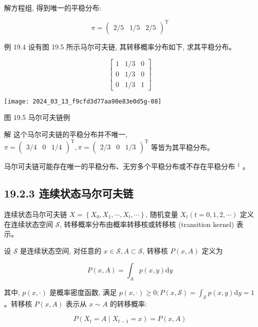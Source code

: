 \documentclass[10pt]{article}
\begin{document}
\begin{CJK*}{UTF8}{bsmi}
解方程组, 得到唯一的平稳分布:

$$
\pi=\left(\begin{array}{lll}
2 / 5 & 1 / 5 & 2 / 5
\end{array}\right)^{\mathrm{T}}
$$

例 19.4 设有图 19.5 所示马尔可夫链, 其转移概率分布如下, 求其平稳分布。

$$
\left[\begin{array}{lll}
1 & 1 / 3 & 0 \\
0 & 1 / 3 & 0 \\
0 & 1 / 3 & 1
\end{array}\right]
$$

\begin{center}
\texttt{[image: 2024\_03\_13\_f9cfd3d77aa90e83e0d5g-08]}
\end{center}

图 19.5 马尔可夫链例

解 这个马尔可夫链的平稳分布并不唯一, $\pi=\left(\begin{array}{lll}3 / 4 & 0 & 1 / 4\end{array}\right)^{\mathrm{T}}, \pi=\left(\begin{array}{lll}2 / 3 & 0 & 1 / 3\end{array}\right)^{\mathrm{T}}$ 等皆为其平稳分布。

马尔可夫链可能存在唯一的平稳分布、无穷多个平稳分布或不存在平稳分布 ${ }^{1}$ 。

\subsection*{19.2.3 连续状态马尔可夫链}
连续状态马尔可夫链 $X=\left\{X_{0}, X_{1}, \cdots, X_{t}, \cdots\right\}$, 随机变量 $X_{t}(t=0,1,2, \cdots)$ 定义在连续状态空间 $\mathcal{S}$, 转移概率分布由概率转移核或转移核 (transition kernel) 表示。

设 $\mathcal{S}$ 是连续状态空间, 对任意的 $x \in \mathcal{S}, A \subset \mathcal{S}$, 转移核 $P(x, A)$ 定义为


\begin{equation*}
P(x, A)=\int_{A} p(x, y) \mathrm{d} y \tag{19.19}
\end{equation*}


其中, $p(x, \cdot)$ 是概率密度函数, 满足 $p(x, \cdot) \geqslant 0 ; P(x, \mathcal{S})=\int_{\mathcal{S}} p(x, y) \mathrm{d} y=1$ 。转移核 $P(x, A)$ 表示从 $x \sim A$ 的转移概率:


\begin{equation*}
P\left(X_{t}=A \mid X_{t-1}=x\right)=P(x, A) \tag{19.20}
\end{equation*}



\end{CJK*}
\end{document}

